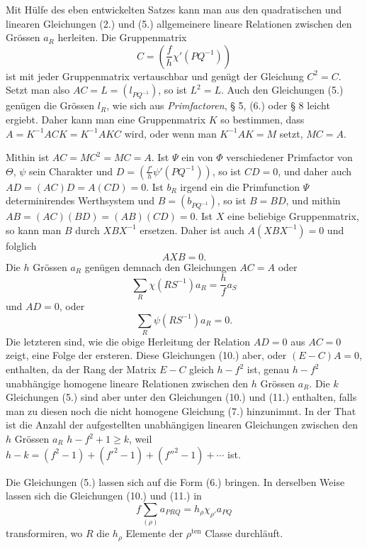 \documentclass[11pt]{article}
\newcommand{\ten}{\mathrm{ten}}
\begin{document}
Mit Hülfe des eben entwickelten Satzes kann man aus den quadratischen und linearen Gleichungen (2.) und (5.) allgemeinere lineare Relationen zwischen den Grössen $a_R$ herleiten. Die Gruppenmatrix
\[
C=\left(\frac{f}{h}\chi'(PQ^{-1})\right)
\]
ist mit jeder Gruppenmatrix vertauschbar und genügt der Gleichung $C^2=C$. Setzt man also $AC=L=(l_{PQ^{-1}})$, so ist $L^2=L$. Auch den Gleichungen (5.) genügen die Grössen $l_R$, wie sich aus \emph{Primfactoren}, § 5, (6.) oder § 8 leicht ergiebt. Daher kann man eine Gruppenmatrix $K$ so bestimmen, dass $A=K^{-1}ACK=K^{-1}AKC$ wird, oder wenn man $K^{-1}AK=M$ setzt, $MC=A$.

Mithin ist $AC=MC^2=MC=A$. Ist $\Psi$ ein von $\Phi$ verschiedener Primfactor von $\Theta$, $\psi$ sein Charakter und $D=\left(\frac{f'}{h}\psi'(PQ^{-1})\right)$, so ist $CD=0$, und daher auch $AD=(AC)D=A(CD)=0$. Ist $b_R$ irgend ein die Primfunction $\Psi$ determinirendes Werthsystem und $B=(b_{PQ^{-1}})$, so ist $B=BD$, und mithin $AB=(AC)(BD)=(AB)(CD)=0$. Ist $X$ eine beliebige Gruppenmatrix, so kann man $B$ durch $XBX^{-1}$ ersetzen. Daher ist auch $A(XBX^{-1})=0$ und folglich
\begin{equation}\tag{9.}
AXB=0.
\end{equation}
Die $h$ Grössen $a_R$ genügen demnach den Gleichungen $AC=A$ oder
\begin{equation}\tag{10.}
\sum_R\chi(RS^{-1})a_R=\frac{h}{f}a_S
\end{equation}
und $AD=0$, oder
\begin{equation}\tag{11.}
\sum_R\psi(RS^{-1})a_R=0.
\end{equation}
Die letzteren sind, wie die obige Herleitung der Relation $AD=0$ aus $AC=0$ zeigt, eine Folge der ersteren. Diese Gleichungen (10.) aber, oder $(E-C)A=0$, enthalten, da der Rang der Matrix $E-C$ gleich $h-f^2$ ist, genau $h-f^2$ unabhängige homogene lineare Relationen zwischen den $h$ Grössen $a_R$. Die $k$ Gleichungen (5.) sind aber unter den Gleichungen (10.) und (11.) enthalten, falls man zu diesen noch die nicht homogene Gleichung (7.) hinzunimmt. In der That ist die Anzahl der aufgestellten unabhängigen linearen Gleichungen zwischen den $h$ Grössen $a_R$ $h-f^2+1\geq k$, weil $h-k=(f^2-1)+(f'^2-1)+(f''^2-1)+\cdots$ ist.

Die Gleichungen (5.) lassen sich auf die Form (6.) bringen. In derselben Weise lassen sich die Gleichungen (10.) und (11.) in
\begin{equation}\tag{12.}
f\sum_{(\rho)}a_{PRQ}=h_\rho\chi_{\rho'}a_{PQ}
\end{equation}
transformiren, wo $R$ die $h_\rho$ Elemente der $\rho^{\ten}$ Classe durchläuft.
\end{document}
